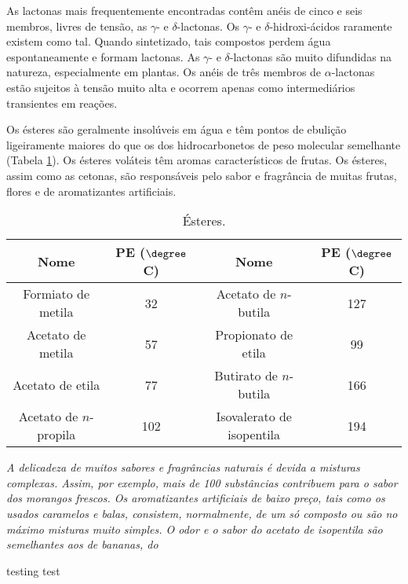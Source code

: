 \noindent As lactonas mais frequentemente encontradas contêm anéis de cinco e seis membros, livres de tensão, as $\gamma$- e $\delta$-lactonas. Os $\gamma$- e $\delta$-hidroxi-ácidos raramente existem como tal. Quando sintetizado, tais compostos perdem água espontaneamente e formam lactonas. As $\gamma$- e $\delta$-lactonas são muito difundidas na natureza, especialmente em plantas. Os anéis de três membros de $\alpha$-lactonas estão sujeitos à tensão muito alta e ocorrem apenas como intermediários transientes em reações.

\begin{tightcenter}
    \chemnameinit{}
    \qquad\qquad
    \qquad\qquad
\end{tightcenter}

Os ésteres são geralmente insolúveis em água e têm pontos de ebulição ligeiramente maiores do que os dos hidrocarbonetos de peso molecular semelhante (Tabela \ref{tab8_3}). Os ésteres voláteis têm aromas característicos de frutas. Os ésteres, assim como as cetonas, são responsáveis pelo sabor e fragrância de muitas frutas, flores e de aromatizantes artificiais.

\begin{table}[H]
    \centering
    \caption{Ésteres.}
    \label{tab8_3}
    \begin{tabular}{cccc}
        \toprule
        Nome & PE ($\degree$C) & Nome & PE ($\degree$C)  \\
        \midrule
        Formiato de metila & 32 & Acetato de $n$-butila & 127 \\
        Acetato de metila & 57 & Propionato de etila & 99 \\
        Acetato de etila & 77 & Butirato de $n$-butila & 166 \\
        Acetato de $n$-propila & 102 & Isovalerato de isopentila & 194 \\
        \bottomrule
    \end{tabular}
\end{table}

\par\bigskip
\noindent\emph{A delicadeza de muitos sabores e fragrâncias naturais é devida a misturas complexas. Assim, por exemplo, mais de 100 substâncias contribuem para o sabor dos morangos frescos. Os aromatizantes artificiais de baixo preço, tais como os usados caramelos e balas, consistem, normalmente, de um só composto ou são no máximo misturas muito simples. O odor e o sabor do acetato de isopentila são semelhantes aos de bananas, do} 

testing test

